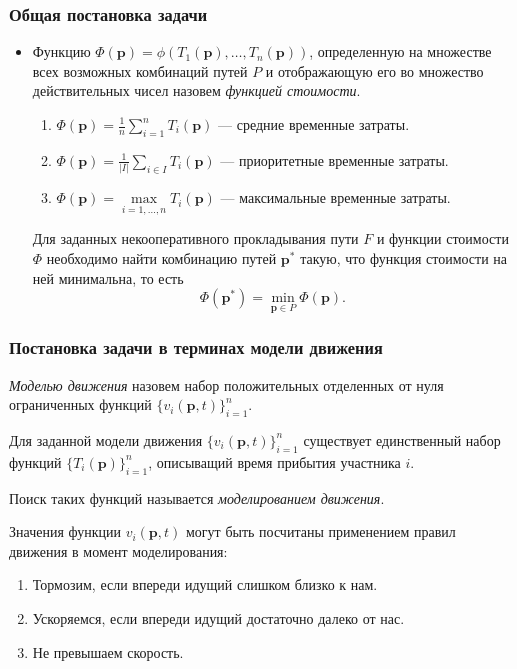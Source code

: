 \documentclass{beamer}
\DeclareMathOperator*{\minn}{min}
\begin{document}
\begin{frame}\frametitle{Общая постановка задачи}
 
    \begin{itemize}
  	
  	\item  Функцию $\Phi (\textbf{p}) = \phi (T_1 (\textbf{p}), \ldots, T_n(\textbf{p}))$, определенную на множестве всех возможных комбинаций путей $P$ и отображающую его во множество действительных чисел назовем \textit{функцией стоимости}.
  	\begin{enumerate}
  		\item  $\Phi (\textbf{p}) = \frac{1}{n}\sum\limits_{i = 1}^n T_i (\textbf{p})$ --- средние временные затраты. 
  		\item  $\Phi (\textbf{p}) = \frac{1}{|I|}\sum\limits_{i \in I} T_i (\textbf{p})$ --- приоритетные временные затраты.
  		\item  $\Phi (\textbf{p}) = \max\limits_{i = 1, \ldots, n} T_i (\textbf{p})$ --- максимальные временные затраты.
  	\end{enumerate}
  
  	\bigskip
	Для заданных некооперативного прокладывания пути $F$ и функции стоимости $\Phi$ необходимо найти комбинацию путей $\textbf{p}^*$ такую, что функция стоимости на ней минимальна, то есть
	\begin{equation}
		\Phi (\textbf{p}^*) = \minn\limits_{ \textbf{p} \in P} \Phi (\textbf{p}).
	\end{equation}
  	
  \end{itemize}
\end{frame}

\begin{frame}\frametitle{Постановка задачи в терминах модели движения}
\textit{Моделью движения} назовем набор положительных отделенных от нуля ограниченных функций $\{v_i(\textbf{p}, t)\}_{i = 1}^n$.

\begin{theorem}
	Для заданной модели движения $\{v_i(\textbf{p}, t)\}_{i = 1}^n$ существует единственный набор функций $\{T_i(\textbf{p})\}_{i = 1}^n$, описыващий время прибытия участника $i$.
\end{theorem}

Поиск таких функций называется \textit{моделированием движения}.

Значения функции $v_i(\textbf{p}, t)$ могут быть посчитаны применением правил движения в момент моделирования:
\begin{enumerate}
	\item Тормозим, если впереди идущий слишком близко к нам.
	\item Ускоряемся, если впереди идущий достаточно далеко от нас.
	\item Не превышаем скорость.
\end{enumerate}
\end{frame}
\end{document}
